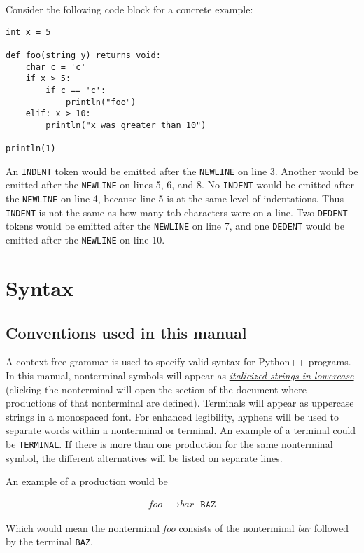 \documentclass{article}
\begin{document}
Consider the following code block for a concrete example:
\begin{verbatim}
int x = 5

def foo(string y) returns void:
    char c = 'c'
    if x > 5:
        if c == 'c':
            println("foo")
    elif: x > 10:
        println("x was greater than 10")
        
println(1)

\end{verbatim}
An \texttt{INDENT} token would be emitted after the \texttt{NEWLINE} on line 3. Another would be emitted after the \texttt{NEWLINE} on lines 5, 6, and 8. No \texttt{INDENT} would be emitted after the \texttt{NEWLINE} on line 4, because line 5 is at the same level of indentations. Thus \texttt{INDENT} is not the same as how many tab characters were on a line. Two \texttt{DEDENT} tokens would be emitted after the \texttt{NEWLINE} on line 7, and one \texttt{DEDENT} would be emitted after the \texttt{NEWLINE} on line 10.

\section{Syntax}
\subsection{Conventions used in this manual}
\label{sec:italicized-strings-in-lowercase}
\label{sec:bar}
A context-free grammar is used to specify valid syntax for Python++ programs. In this manual, nonterminal symbols will appear as \hyperref[sec:italicized-strings-in-lowercase]{\textit{italicized-strings-in-lowercase}} (clicking the nonterminal will open the section of the document where productions of that nonterminal are defined). Terminals will appear as uppercase strings in a monospaced font. For enhanced legibility, hyphens will be used to separate words within a nonterminal or terminal. An example of a terminal could be  \texttt{TERMINAL}. If there is more than one production for the same nonterminal symbol, the different alternatives will be listed on separate lines.

An example of a production would be

\begin{align*}
    \textit{foo} &\to \hyperref[sec:bar]{\textit{bar}} \texttt{ } \texttt{BAZ}
\end{align*}

Which would mean the nonterminal \textit{foo} consists of the nonterminal \textit{bar} followed by the terminal \texttt{BAZ}.
\end{document}
